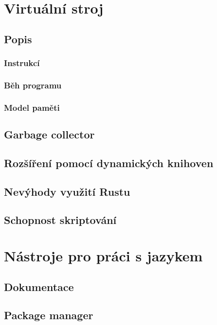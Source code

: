 \documentclass[12pt, a4paper,
twoside,        %
openright
]{report}
\begin{document}
\chapter{Virtuální stroj}

\section{Popis}

\subsection{Instrukcí}

\subsection{Běh programu}

\subsection{Model paměti}

\section{Garbage collector}

\section{Rozšíření pomocí dynamických knihoven}

\section{Nevýhody využití Rustu}

\section{Schopnost skriptování}

\chapter{Nástroje pro práci s jazykem}

\section{Dokumentace}

\section{Package manager}
\end{document}
